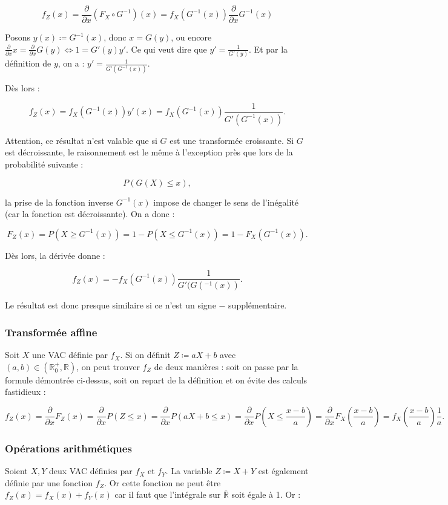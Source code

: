 \documentclass{article}
\renewcommand{\pd}[1]{\frac {\partial}{\partial #1}}
\begin{document}
			\[f_Z(x) = \pd x(F_X \circ G^{-1})(x) = f_X(G^{-1}(x))\pd xG^{-1}(x)\]

			Posons $y(x) \coloneqq G^{-1}(x)$, donc $x = G(y)$, ou encore $\pd xx = \pd xG(y) \iff 1 = G'(y)y'$. Ce qui veut dire que $y' = \frac 1{G'(y)}$. Et par la définition
			de $y$, on a : $y' = \frac 1{G'(G^{-1}(x))}$.

			Dès lors :

			\[f_Z(x) = f_X(G^{-1}(x))y'(x) = f_X(G^{-1}(x))\frac 1{G'(G^{-1}(x))}.\]

			Attention, ce résultat n'est valable que si $G$ est une transformée croissante. Si $G$ est décroissante, le raisonnement est le même à l'exception près que lors
			de la probabilité suivante :

			\[P(G(X) \leq x),\]

			la prise de la fonction inverse $G^{-1}(x)$ impose de changer le sens de l'inégalité (car la fonction est décroissante). On a donc :

			\[F_Z(x) = P(X \geq G^{-1}(x)) = 1 - P(X \leq G^{-1}(x)) = 1 - F_X(G^{-1}(x)).\]

			Dès lors, la dérivée donne :

			\[f_Z(x) = -f_X(G^{-1}(x))\frac 1{G'(G(^{-1}(x))}.\]

			Le résultat est donc presque similaire si ce n'est un signe $-$ supplémentaire.

		\subsubsection{Transformée affine}
			Soit $X$ une VAC définie par $f_X$. Si on définit $Z \coloneqq aX + b$ avec $(a, b) \in (\mathbb R_0^+, \mathbb R)$, on peut trouver $f_Z$ de deux manières : soit on passe
			par la formule démontrée ci-dessus, soit on repart de la définition et on évite des calculs fastidieux :

			\[f_Z(x) = \pd xF_Z(x) = \pd xP(Z \leq x) = \pd xP(aX + b \leq x) = \pd xP\left(X \leq \frac {x-b}{a}\right) = \pd xF_X\left(\frac {x-b}a\right) = f_X\left(\frac {x-b}a\right)\frac 1a.\]

		\subsubsection{Opérations arithmétiques}
			Soient $X, Y$ deux VAC définies par $f_X$ et $f_Y$. La variable $Z \coloneqq X + Y$ est également définie par une fonction $f_Z$. Or cette fonction ne peut être
			$f_Z(x) = f_X(x) + f_Y(x)$ car il faut que l'intégrale sur $\overline {\mathbb R}$ soit égale à 1. Or :
\end{document}
